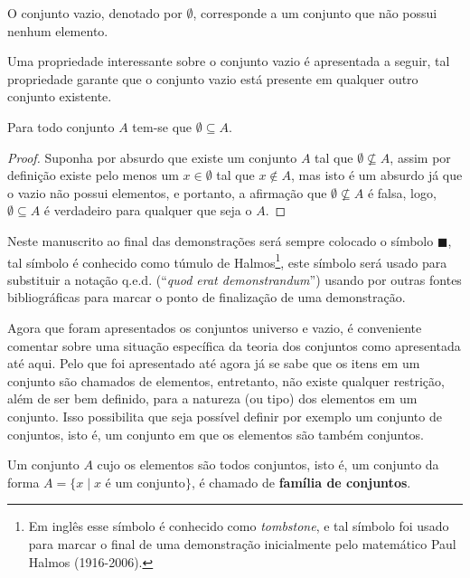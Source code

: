 \begin{definition}\label{def:ConjuntoVazio}
	O conjunto vazio, denotado por $\emptyset$, corresponde a um conjunto que não possui nenhum elemento.
\end{definition} 

Uma propriedade interessante sobre o conjunto vazio é apresentada a seguir, tal propriedade garante que o conjunto vazio está presente em qualquer outro conjunto existente.

\begin{theorem}\label{teo:ConjuntoVazioSubDeTodos}
	Para todo conjunto $A$ tem-se que $\emptyset \subseteq A$.
\end{theorem}

\begin{proof}
	Suponha por absurdo que existe um conjunto $A$ tal que $\emptyset \not\subseteq A$, assim por definição  existe pelo menos um $x \in \emptyset$ tal que $x \notin A$, mas isto é um absurdo já que o vazio não possui elementos, e portanto, a afirmação que $\emptyset \not\subseteq A$ é falsa, logo, $\emptyset \subseteq A$ é verdadeiro para qualquer que seja o $A$.
\end{proof}

\begin{note}
	Neste manuscrito ao final das demonstrações será sempre colocado o símbolo $\blacksquare$, tal símbolo é conhecido como túmulo de Halmos\footnote{Em inglês esse símbolo é conhecido como \textit{tombstone}, e tal símbolo foi usado para marcar o final de uma demonstração inicialmente pelo matemático Paul Halmos (1916-2006).}, este símbolo será usado para substituir a notação q.e.d. (``\textit{quod erat demonstrandum}'') usando por outras fontes bibliográficas para marcar o ponto de finalização de uma demonstração. 
\end{note}

Agora que foram apresentados os conjuntos universo e vazio, é conveniente comentar sobre uma situação específica da teoria dos conjuntos como apresentada até aqui. Pelo que foi apresentado até agora já se sabe que os itens em um conjunto são chamados de elementos, entretanto, não existe qualquer restrição, além de ser bem definido, para a natureza (ou tipo) dos elementos em um conjunto. Isso possibilita que seja possível definir por exemplo um conjunto de conjuntos, isto é, um conjunto em que os elementos são também conjuntos.

\begin{definition}\label{def:Familia}
	Um conjunto $A$ cujo os elementos são todos conjuntos, isto é, um conjunto da forma $A = \{x \mid x \mbox{ é um conjunto}\}$, é chamado de \textbf{família de conjuntos}.
\end{definition}

